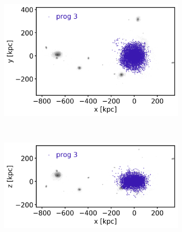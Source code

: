 \begin{figure}[htbp]
    \begin{subfigure}[c]{0.48\textwidth}
    \centering
    	\includegraphics[width=\textwidth]{plots/Dynamics/dist/xy_dist_wodisk_GCs_prog_3_snap_127.png}
    	\label{fig:prog3_xy}
    \end{subfigure}
    ~ %
    \begin{subfigure}[c]{0.48\textwidth}
        \centering
    	\includegraphics[width=\textwidth]{plots/Dynamics/dist/xz_dist_wodisk_GCs_prog_3_snap_127.png}
	    \label{fig:prog3_xz}
    \end{subfigure}
    

\end{figure}
